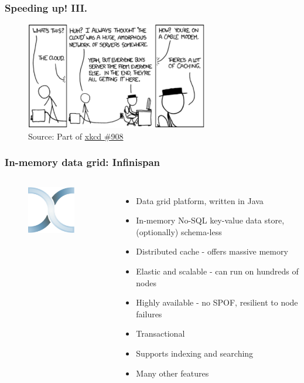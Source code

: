 \documentclass[10pt,utf8]{beamer}
\begin{document}
\begin{frame}
	\frametitle{Speeding up! III.}
	
	\vspace{0.5cm}
	\vspace{0.5cm}
	
	\begin{figure}
		\centering
		\includegraphics[width=8cm]{./img/xkcd_908.eps}
		\caption{\tiny{Source: Part of \href{http://xkcd.com/908/}{xkcd \#908}}}
	\end{figure}
\end{frame}

\begin{frame}
	\frametitle{In-memory data grid: Infinispan}
	\begin{columns}
		\begin{figure}
			\centering
			\includegraphics[width=3cm]{./img/infinispan.eps}
		\end{figure}
		\centering
		\vspace{0.3cm}
		\textbf{}
		\begin{itemize}
			\item Data grid platform, written in Java
			\item In-memory No-SQL key-value data store, (optionally) schema-less
			\item Distributed cache - offers massive memory
			\item Elastic and scalable - can run on hundreds of nodes
			\item Highly available - no SPOF, resilient to node failures
			\item Transactional
			\item Supports indexing and searching
			\item Many other features
		\end{itemize}
	\end{columns}
\end{frame}
\end{document}
